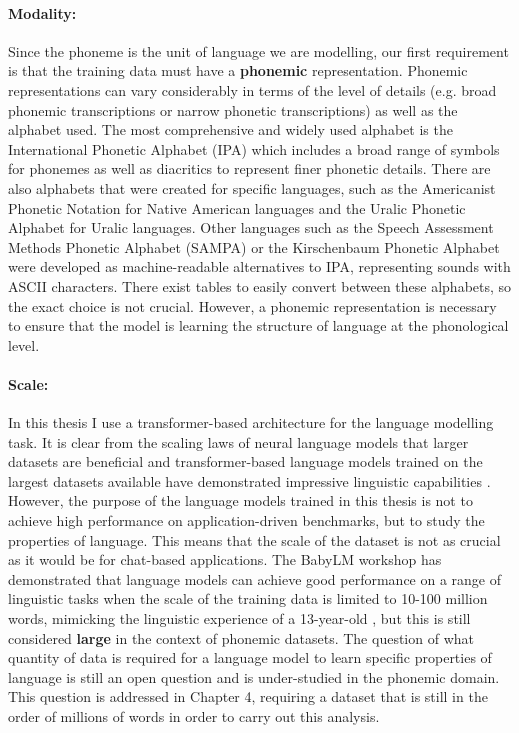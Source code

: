 \paragraph{Modality:} Since the phoneme is the unit of language we are modelling, our first requirement is that the training data must have a \textbf{phonemic} representation. Phonemic representations can vary considerably in terms of the level of details (e.g. broad phonemic transcriptions or narrow phonetic transcriptions) as well as the alphabet used. The most comprehensive and widely used alphabet is the International Phonetic Alphabet (IPA) which includes a broad range of symbols for phonemes as well as diacritics to represent finer phonetic details. There are also alphabets that were created for specific languages, such as the Americanist Phonetic Notation for Native American languages and the Uralic Phonetic Alphabet for Uralic languages. Other languages such as the Speech Assessment Methods Phonetic Alphabet (SAMPA) \citep{wells1992standard} or the Kirschenbaum Phonetic Alphabet were developed as machine-readable alternatives to IPA, representing sounds with ASCII characters. There exist tables to easily convert between these alphabets, so the exact choice is not crucial. However, a phonemic representation is necessary to ensure that the model is learning the structure of language at the phonological level. 

\paragraph{Scale:} In this thesis I use a transformer-based architecture for the language modelling task. It is clear from the scaling laws of neural language models that larger datasets are beneficial \citep{bansal-2022-datascaling} and transformer-based language models trained on the largest datasets available have demonstrated impressive linguistic capabilities . However, the purpose of the language models trained in this thesis is not to achieve high performance on application-driven benchmarks, but to study the properties of language. This means that the scale of the dataset is not as crucial as it would be for chat-based applications. The BabyLM workshop has demonstrated that language models can achieve good performance on a range of linguistic tasks when the scale of the training data is limited to 10-100 million words, mimicking the linguistic experience of a 13-year-old \citep{warstadt-2023-babylm-findings}, but this is still considered \textbf{large} in the context of phonemic datasets. The question of what quantity of data is required for a language model to learn specific properties of language is still an open question and is under-studied in the phonemic domain. This question is addressed in Chapter 4, requiring a dataset that is still in the order of millions of words in order to carry out this analysis.

